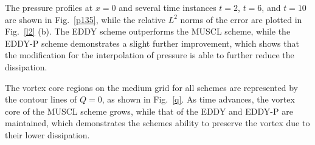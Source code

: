 The pressure profiles at $x=0$ and several time instances $t=2$, $t=6$, and $t=10$ are shown in Fig.~\ref{p135}, while the relative $L^{2}$ norms of the error are plotted in Fig.~\ref{l2} (b). The EDDY scheme outperforms the MUSCL scheme, while the EDDY-P scheme demonstrates a slight further improvement, which shows that the modification for the interpolation of pressure is able to further reduce the dissipation. 


The vortex core regions on the medium grid for all schemes are represented by the contour lines of $Q=0$, as shown in Fig.~\ref{q}. As time advances, the vortex core of the MUSCL scheme grows, while that of the EDDY and EDDY-P are maintained, which demonstrates the schemes ability to preserve the vortex due to their lower dissipation.


